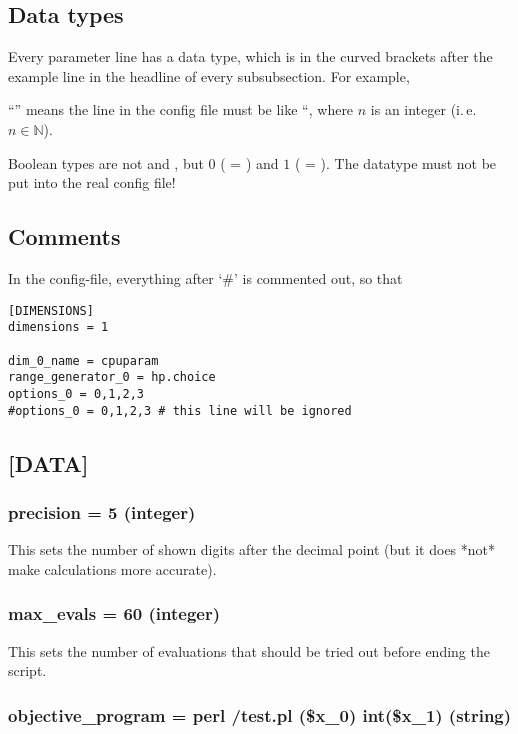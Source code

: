 \documentclass[]{scrartcl}
\begin{document}
\subsection{Data types}

Every parameter line has a data type, which is in the curved brackets after the example 
line in the headline of every subsubsection. For example,

``'' means the line in the config file must be
like ``, where $n$ is an integer (i.\,e. $n \in \mathbb{N}$).

Boolean types are not  and , but $0$ ( = ) and
$1$ ( = ). The datatype must not be put into the real config file!

\subsection{Comments}

In the config-file, everything after `\#' is commented out, so that

\begin{verbatim}
[DIMENSIONS]
dimensions = 1

dim_0_name = cpuparam
range_generator_0 = hp.choice
options_0 = 0,1,2,3
#options_0 = 0,1,2,3 # this line will be ignored
\end{verbatim}

\subsection{[DATA]}

\subsubsection{precision = 5 (integer)}

This sets the number of shown digits after the decimal point (but it does *not*
make calculations more accurate).

\subsubsection{max\_evals = 60 (integer)}

This sets the number of evaluations that should be tried out before ending
the script.

\subsubsection{objective\_program = perl /test.pl (\$x\_0) int(\$x\_1) (string)}
\end{document}
